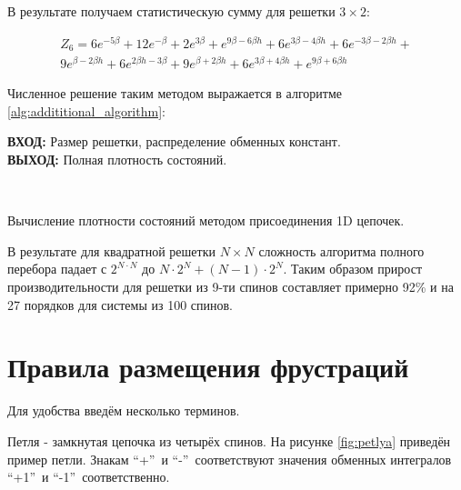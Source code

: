 \documentclass[utf8, babel, sor, jor, amsmath, amssymb, reprint]{elsarticle} %
\begin{document}
В результате получаем статистическую сумму для решетки $3 \times 2$:

\begin{equation}
	\label{eq:stat_3_res}
	\begin{alignedat}{2}
		Z_6 = 6 e^{-5 \beta }+12 e^{-\beta }+2 e^{3 \beta }+e^{9 \beta -6 \beta  h}+6 e^{3 \beta -4 \beta  h}+6 e^{-3 \beta -2 \beta  h}+\\
		9 e^{\beta -2 \beta  h}+6 e^{2 \beta  h-3 \beta }+9 e^{\beta +2 \beta  h}+6 e^{3 \beta +4 \beta  h}+e^{9 \beta +6 \beta  h}
	\end{alignedat}
\end{equation}

Численное решение таким методом выражается в алгоритме \ref{alg:addititional_algorithm}:


\begin{algorithm}[H]
	\textbf{ВХОД:} Размер решетки, распределение обменных констант.\\
	\textbf{ВЫХОД:} Полная плотность состояний.
	\begin{algorithmic}
		{
			{
			}
			\ENDFOR\\
		}
		\ENDFOR
	\end{algorithmic}
	\caption{Вычисление плотности состояний методом присоединения 1D цепочек.}
	\label{alg:addititional_algorithm}
\end{algorithm}
				
В результате для квадратной решетки $N \times N$ сложность алгоритма полного перебора падает с $2^{N \cdot N}$ до $N \cdot 2^N + (N - 1) \cdot 2^N$. Таким образом прирост производительности для решетки из 9-ти спинов составляет примерно 92\% и на 27 порядков для системы из 100 спинов.


\section{Правила размещения фрустраций}

Для удобства введём несколько терминов.

Петля - замкнутая цепочка из четырёх спинов. На рисунке \ref{fig:petlya} приведён пример петли. Знакам \textquotedblleft +\textquotedblright ~и   \textquotedblleft -\textquotedblright ~соответствуют значения обменных интегралов  \textquotedblleft +1\textquotedblright ~и \textquotedblleft -1\textquotedblright ~соответственно.
\end{document}
